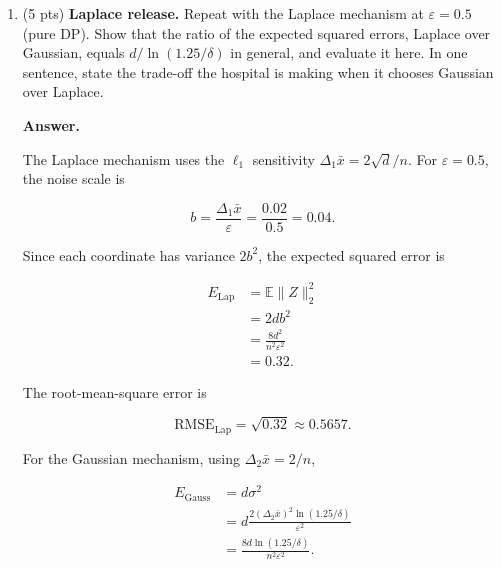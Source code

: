 \documentclass[11pt]{article}
\newcommand{\eps}{\varepsilon}
\newenvironment{answer}{\par\medskip\noindent\textbf{Answer.}\ }{\par\bigskip}
\begin{document}
\begin{enumerate}
\begin{answer}
By the triangle inequality,

\[
\|\bar{x}\|_2
\leq\frac{1}{n}\sum_{i=1}^n\|x_i\|_2
\leq 1.
\]

Thus, the RMSE is about $19.4\%$ of the
maximum possible signal magnitude.
If the actual mean is much smaller than $1$,
the noise may dominate the signal, making
the release less useful.

The Gaussian mechanism theorem used above
requires $0<\eps<1$, so it cannot be directly
applied when $\eps=2$.
Instead, we could use the analytic Gaussian
mechanism, which provides a valid noise
calibration for larger values of $\eps$.

\end{answer}

\item (5 pts) \textbf{Laplace release.} Repeat with the Laplace mechanism at
$\eps=0.5$ (pure DP). Show that the ratio of the expected squared errors,
Laplace over Gaussian, equals $d/\ln(1.25/\delta)$ in general, and evaluate it
here. In one sentence, state the trade-off the hospital is making when it
chooses Gaussian over Laplace.

\begin{answer}

The Laplace mechanism uses the $\ell_1$
sensitivity $\Delta_1\bar{x}=2\sqrt{d}/n$.
For $\eps=0.5$, the noise scale is

\[
b=\frac{\Delta_1\bar{x}}{\eps}
=\frac{0.02}{0.5}=0.04.
\]

Since each coordinate has variance $2b^2$,
the expected squared error is

\[
\begin{aligned}
E_{\mathrm{Lap}}
&=\mathbb{E}\|Z\|_2^2\\
&=2db^2\\
&=\frac{8d^2}{n^2\eps^2}\\
&=0.32.
\end{aligned}
\]

The root-mean-square error is

\[
\mathrm{RMSE}_{\mathrm{Lap}}
=\sqrt{0.32}\approx0.5657.
\]

For the Gaussian mechanism, using
$\Delta_2\bar{x}=2/n$,

\[
\begin{aligned}
E_{\mathrm{Gauss}}
&=d\sigma^2\\
&=d\frac{2(\Delta_2\bar{x})^2
\ln(1.25/\delta)}{\eps^2}\\
&=\frac{8d\ln(1.25/\delta)}
{n^2\eps^2}.
\end{aligned}
\]


\end{answer}
\end{enumerate}
\end{document}
